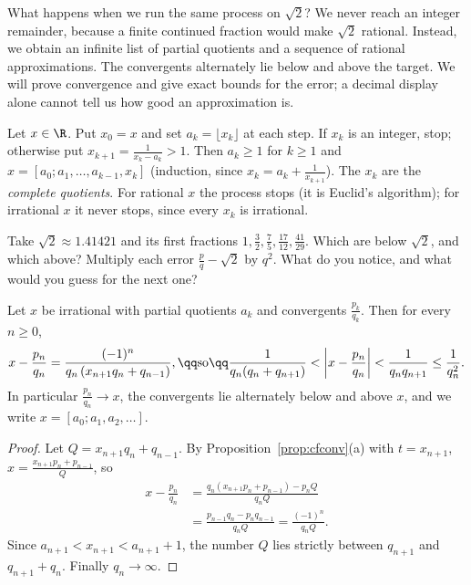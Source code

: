 What happens when we run the same process on $\sqrt2$? We never reach an integer remainder, because a finite continued fraction would make $\sqrt2$ rational. Instead, we obtain an infinite list of partial quotients and a sequence of rational approximations. The convergents alternately lie below and above the target. We will prove convergence and give exact bounds for the error; a decimal display alone cannot tell us how good an approximation is.

Let $x\in\R$. Put $x_0=x$ and set $a_k=\lfloor x_k\rfloor$ at each step. If $x_k$ is an integer, stop; otherwise put $x_{k+1}=\frac1{x_k-a_k}>1$. Then $a_k\ge1$ for $k\ge1$ and $x=[a_0;a_1,\dots,a_{k-1},x_k]$ (induction, since $x_k=a_k+\frac1{x_{k+1}}$). The $x_k$ are the \emph{complete quotients}. For rational $x$ the process stops (it is Euclid's algorithm); for irrational $x$ it never stops, since every $x_k$ is irrational.

\begin{think}
Take $\sqrt2\approx1.41421$ and its first fractions $1,\frac32,\frac75,\frac{17}{12},\frac{41}{29}$. Which are below $\sqrt2$, and which above? Multiply each error $\frac pq-\sqrt2$ by $q^2$. What do you notice, and what would you guess for the next one?
\end{think}

\begin{theorem}\label{thm:cfapprox}
Let $x$ be irrational with partial quotients $a_k$ and convergents $\frac{p_k}{q_k}$. Then for every $n\ge0$,
\[
\begin{gathered}x-\frac{p_n}{q_n}=\frac{(-1)^n}{q_n\left(x_{n+1}q_n+q_{n-1}\right)},\qq\text{so}\qq\frac1{q_n(q_n+q_{n+1})}<\left|x-\frac{p_n}{q_n}\right|<\frac1{q_nq_{n+1}}\le\frac1{q_n^2}.\end{gathered}
\]
In particular $\frac{p_n}{q_n}\to x$, the convergents lie alternately below and above $x$, and we write $x=[a_0;a_1,a_2,\dots]$.
\end{theorem}
\begin{proof}
Let $Q=x_{n+1}q_n+q_{n-1}$. By Proposition~\ref{prop:cfconv}(a) with $t=x_{n+1}$, $x=\frac{x_{n+1}p_n+p_{n-1}}Q$, so
\[
\begin{aligned}x-\frac{p_n}{q_n}&=\frac{q_n(x_{n+1}p_n+p_{n-1})-p_nQ}{q_nQ}\\&=\frac{p_{n-1}q_n-p_nq_{n-1}}{q_nQ}=\frac{(-1)^n}{q_nQ}.\end{aligned}
\]
Since $a_{n+1}<x_{n+1}<a_{n+1}+1$, the number $Q$ lies strictly between $q_{n+1}$ and $q_{n+1}+q_n$. Finally $q_n\to\infty$.
\end{proof}

